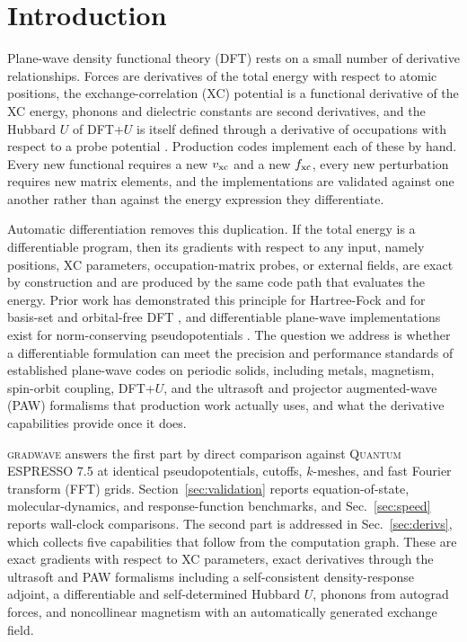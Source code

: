 \documentclass[11pt,twocolumn]{article}
\newcommand{\gw}{\textsc{gradwave}}
\newcommand{\qe}{\textsc{Quantum ESPRESSO}}
\begin{document}
\section{Introduction}

Plane-wave density functional theory (DFT) rests on a small number of
derivative relationships. Forces are derivatives of the total energy with
respect to atomic positions, the exchange-correlation (XC) potential is a
functional derivative of the XC energy, phonons and dielectric constants are
second derivatives, and the Hubbard $U$ of DFT+$U$ is itself defined through
a derivative of occupations with respect to a probe potential
\cite{baroni2001,cococcioni2005}. Production codes implement each of these
by hand. Every new functional requires a new $v_{\rm xc}$ and a new
$f_{\rm xc}$, every new perturbation requires new matrix elements, and the
implementations are validated against one another rather than against the
energy expression they differentiate.

Automatic differentiation removes this duplication. If the total energy is
a differentiable program, then its gradients with respect to any input,
namely positions, XC parameters, occupation-matrix probes, or external
fields, are exact by construction and are produced by the same code path
that evaluates the energy. Prior work has demonstrated this principle for
Hartree-Fock and for basis-set and orbital-free DFT
\cite{tamayo2018,kasim2021}, and differentiable plane-wave implementations
exist for norm-conserving pseudopotentials \cite{kasim2021}. The question
we address is whether a differentiable formulation can meet the precision
and performance standards of established plane-wave codes on periodic
solids, including metals, magnetism, spin-orbit coupling, DFT+$U$, and the
ultrasoft and projector augmented-wave (PAW) formalisms
\cite{vanderbilt1990,blochl1994,kresse1999} that production work actually
uses, and what the derivative capabilities provide once it does.

\gw{} answers the first part by direct comparison against \qe{} 7.5
\cite{giannozzi2020} at identical pseudopotentials, cutoffs, $k$-meshes, and
fast Fourier transform (FFT) grids. Section~\ref{sec:validation} reports
equation-of-state, molecular-dynamics, and response-function benchmarks, and
Sec.~\ref{sec:speed} reports wall-clock comparisons. The second part is
addressed in Sec.~\ref{sec:derivs}, which collects five capabilities that
follow from the computation graph. These are exact gradients with respect
to XC parameters, exact derivatives through the ultrasoft and PAW
formalisms including a self-consistent density-response adjoint, a
differentiable and self-determined Hubbard $U$, phonons from autograd
forces, and noncollinear magnetism with an automatically generated
exchange field.
\end{document}
